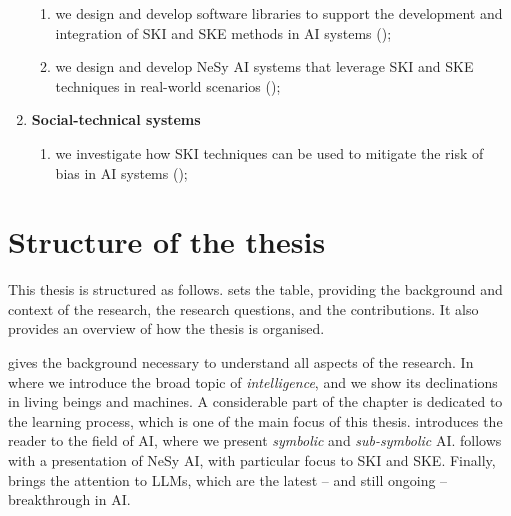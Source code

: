 \begin{refsection}
\begin{enumerate}[label=\emph{(\roman*)}]
    \begin{enumerate}[label=\emph{(\arabic*)},resume]
        \item we design and develop software libraries to support the development and integration of \gls{SKI} and \gls{SKE} methods in \gls{AI} systems ();
        \item we design and develop \gls{NeSy} \gls{AI} systems that leverage \gls{SKI} and \gls{SKE} techniques in real-world scenarios ();
    \end{enumerate}
    \item \textbf{Social-technical systems}

    \begin{enumerate}[label=\emph{(\arabic*)},resume]
        \item we investigate how \gls{SKI} techniques can be used to mitigate the risk of bias in \gls{AI} systems ();
    \end{enumerate}
\end{enumerate}


\section{Structure of the thesis}
\label{sec:structure-of-the-thesis}
%
This thesis is structured as follows.
%
 sets the table, providing the background and context of the research, the research questions, and the contributions.
%
It also provides an overview of how the thesis is organised.


 gives the background necessary to understand all aspects of the research.
%
In  where we introduce the broad topic of \emph{intelligence}, and we show its declinations in living beings and machines.
%
A considerable part of the chapter is dedicated to the learning process, which is one of the main focus of this thesis.
%
 introduces the reader to the field of \gls{AI}, where we present \emph{symbolic} and \emph{sub-symbolic} \gls{AI}.
%
 follows with a presentation of \gls{NeSy} \gls{AI}, with particular focus to \gls{SKI} and \gls{SKE}.
%
Finally,  brings the attention to \glspl{LLM}, which are the latest -- and still ongoing -- breakthrough in \gls{AI}.


\printbibliography[title=Reference,heading=bibintoc]

\end{refsection}